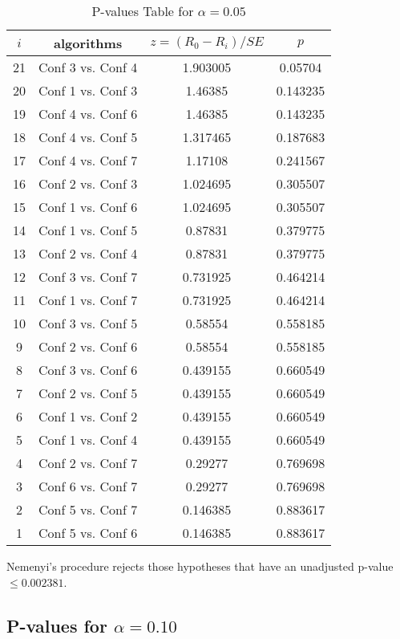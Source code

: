 \documentclass[a4paper,10pt]{article}
\begin{document}
\begin{landscape}
\begin{table}[!htp]
\centering\scriptsize
\begin{tabular}{cccc}
$i$&algorithms&$z=(R_0 - R_i)/SE$&$p$\\
\hline21&Conf 3 vs. Conf 4&1.903005&0.05704\\
20&Conf 1 vs. Conf 3&1.46385&0.143235\\
19&Conf 4 vs. Conf 6&1.46385&0.143235\\
18&Conf 4 vs. Conf 5&1.317465&0.187683\\
17&Conf 4 vs. Conf 7&1.17108&0.241567\\
16&Conf 2 vs. Conf 3&1.024695&0.305507\\
15&Conf 1 vs. Conf 6&1.024695&0.305507\\
14&Conf 1 vs. Conf 5&0.87831&0.379775\\
13&Conf 2 vs. Conf 4&0.87831&0.379775\\
12&Conf 3 vs. Conf 7&0.731925&0.464214\\
11&Conf 1 vs. Conf 7&0.731925&0.464214\\
10&Conf 3 vs. Conf 5&0.58554&0.558185\\
9&Conf 2 vs. Conf 6&0.58554&0.558185\\
8&Conf 3 vs. Conf 6&0.439155&0.660549\\
7&Conf 2 vs. Conf 5&0.439155&0.660549\\
6&Conf 1 vs. Conf 2&0.439155&0.660549\\
5&Conf 1 vs. Conf 4&0.439155&0.660549\\
4&Conf 2 vs. Conf 7&0.29277&0.769698\\
3&Conf 6 vs. Conf 7&0.29277&0.769698\\
2&Conf 5 vs. Conf 7&0.146385&0.883617\\
1&Conf 5 vs. Conf 6&0.146385&0.883617\\
\hline
\end{tabular}
\caption{P-values Table for $\alpha=0.05$}
\end{table}Nemenyi's procedure rejects those hypotheses that have an unadjusted p-value $\le0.002381$.

\pagebreak

\subsection{P-values for $\alpha=0.10$}


\end{landscape}
\end{document}
